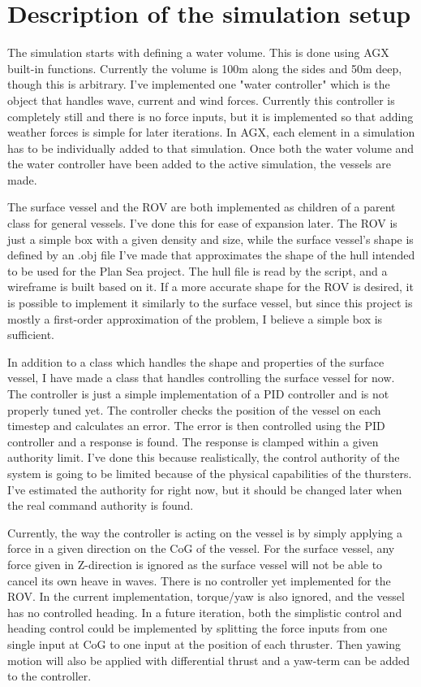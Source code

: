 \section{Description of the simulation setup}
The simulation starts with defining a water volume. This is done using AGX built-in functions. Currently the volume is 100m along the sides and 50m deep, though this is arbitrary. I've implemented one "water controller" which is the object that handles wave, current and wind forces. Currently this controller is completely still and there is no force inputs, but it is implemented so that adding weather forces is simple for later iterations. In AGX, each element in a simulation has to be individually added to that simulation. Once both the water volume and the water controller have been added to the active simulation, the vessels are made.

The surface vessel and the ROV are both implemented as children of a parent class for general vessels. I've done this for ease of expansion later. The ROV is just a simple box with a given density and size, while the surface vessel's shape is defined by an .obj file I've made that approximates the shape of the hull intended to be used for the Plan Sea project. The hull file is read by the script, and a wireframe is built based on it. If a more accurate shape for the ROV is desired, it is possible to implement it similarly to the surface vessel, but since this project is mostly a first-order approximation of the problem, I believe a simple box is sufficient.  

In addition to a class which handles the shape and properties of the surface vessel, I have made a class that handles controlling the surface vessel for now. The controller is just a simple implementation of a PID controller and is not properly tuned yet. The controller checks the position of the vessel on each timestep and calculates an error. The error is then controlled using the PID controller and a response is found. The response is clamped within a given authority limit. I've done this because realistically, the control authority of the system is going to be limited because of the physical capabilities of the thursters. I've estimated the authority for right now, but it should be changed later when the real command authority is found. 

Currently, the way the controller is acting on the vessel is by simply applying a force in a given direction on the CoG of the vessel. For the surface vessel, any force given in Z-direction is ignored as the surface vessel will not be able to cancel its own heave in waves. There is no controller yet implemented for the ROV. In the current implementation, torque/yaw is also ignored, and the vessel has no controlled heading. In a future iteration, both the simplistic control and heading control could be implemented by splitting the force inputs from one single input at CoG to one input at the position of each thruster. Then yawing motion will also be applied with differential thrust and a yaw-term can be added to the controller. 

